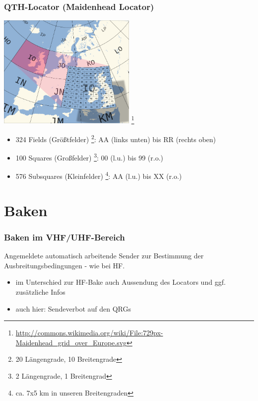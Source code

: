 \begin{frame}
    \frametitle{QTH-Locator (Maidenhead Locator)}

    \begin{center}
        \includegraphics[width=0.5\textwidth]{bv11/Maidenhead_grid_over_Europe.png}
        \footnote{\tiny \url{http://commons.wikimedia.org/wiki/File:729px-Maidenhead_grid_over_Europe.svg}}
    \end{center}

    \begin{itemize}
        \item 324 Fields (Größtfelder)
              \footnote{20 Längengrade, 10 Breitengrade}: AA (links unten) bis RR (rechts oben)
        \item 100 Squares (Großfelder)
              \footnote{2 Längengrade, 1 Breitengrad}: 00 (l.u.) bis 99 (r.o.)
        \item 576 Subsquares (Kleinfelder)
              \footnote{ca. 7x5 km in unseren Breitengraden}: AA (l.u.) bis XX (r.o.)
    \end{itemize}

\end{frame}

\section{Baken}

\begin{frame}
    \frametitle{Baken im VHF/UHF-Bereich}

    Angemeldete automatisch arbeitende Sender zur Bestimmung der
    Ausbreitungsbedingungen - wie bei HF.

    \begin{itemize}
        \item im Unterschied zur HF-Bake auch Aussendung des Locators und ggf.
              zusätzliche Infos
        \item auch hier: Sendeverbot auf den QRGs
    \end{itemize}

\end{frame}

